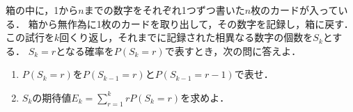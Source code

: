\documentclass[../../main.tex]{subfiles}
\begin{document}
箱の中に，1から$n$までの数字をそれぞれ1つずつ書いた$n$枚のカードが入っている．
箱から無作為に1枚のカードを取り出して，その数字を記録し，箱に戻す．
この試行を$k$回くり返し，それまでに記録された相異なる数字の個数を$S_k$とする．
$S_k=r$となる確率を$P(S_k=r)$で表すとき，次の問に答えよ．
\begin{enumerate}
  \item $P(S_k=r)$を$P(S_{k-1}=r)$と$P(S_{k-1}=r-1)$で表せ．
  \item $S_k$の期待値$\displaystyle E_k=\sum_{r=1}^krP(S_k=r)$を求めよ．
\end{enumerate}
\end{document}
